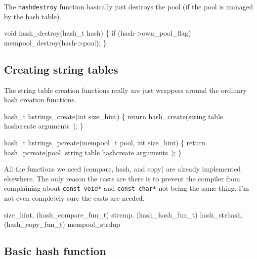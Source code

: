 The {\tt{}hash{}destroy} function basically just destroys the pool
(if the pool is managed by the hash table).

\nwenddocs{}\plusendmoddef
void hash_destroy(hash_t hash)
\{
    if (hash->own_pool_flag)
        mempool_destroy(hash->pool);
\}

\nwendcode{}\nwdocspar


\subsection{Creating string tables}

The string table creation functions really are just wrappers
around the ordinary hash creation functions.

\nwenddocs{}\plusendmoddef
hash_t hstrings_create(int size_hint)
\{
    return hash_create(\LA{}string table \code{}hash{}create\edoc{} arguments~{\nwtagstyle{}}\RA{});
\}

hash_t hstrings_pcreate(mempool_t pool, int size_hint)
\{
    return hash_pcreate(pool,
                        \LA{}string table \code{}hash{}create\edoc{} arguments~{\nwtagstyle{}}\RA{});
\}

\nwendcode{}\nwdocspar

All the functions we need (compare, hash, and copy) are already
implemented elsewhere.  The only reason the casts are there is
to prevent the compiler from complaining about {\tt{}const\ void*} and
{\tt{}const\ char*} not being the same thing.  I'm not even completely
sure the casts are needed.

\nwenddocs{}\endmoddef
size_hint,
(hash_compare_fun_t) strcmp,
(hash_hash_fun_t)    hash_strhash,
(hash_copy_fun_t)    mempool_strdup
\nwendcode{}\nwdocspar


\subsection{Basic hash function}

